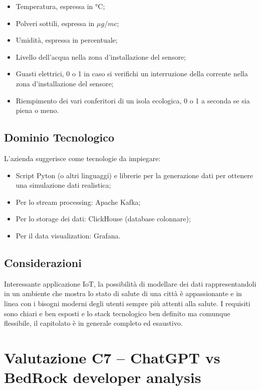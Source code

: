 \documentclass[a4paper, twoside]{article}
\begin{document}
        \begin{itemize}
            \item Temperatura, espressa in °C;
            \item Polveri sottili, espressa in $\mu g/mc$;
            \item Umidità, espressa in percentuale;
            \item Livello dell'acqua nella zona d'installazione
            del sensore;
            \item Guasti elettrici, 0 o 1 in caso si verifichi
            un interruzione della corrente nella zona d'installazione
            del sensore;
            \item Riempimento dei vari conferitori di un isola
            ecologica, 0 o 1 a seconda se sia piena o meno.
        \end{itemize}

    \subsection{Dominio Tecnologico}
        L'azienda suggerisce come tecnologie da impiegare:
        \begin{itemize}
            \item Script Pyton (o altri linguaggi) e librerie per la generazione
            dati per ottenere una simulazione dati realistica;
            \item Per lo stream processing: Apache Kafka;
            \item Per lo storage dei dati: ClickHouse (database colonnare);
            \item Per il data visualization: Grafana.
        \end{itemize}
    \subsection{Considerazioni}
    Interessante applicazione IoT, la possibilità di modellare dei dati rappresentandoli
    in un ambiente che mostra lo stato di salute di una città è appassionante e
    in linea con i bisogni moderni degli utenti sempre più attenti alla salute.
    I requisiti sono chiari e ben esposti e lo stack tecnologico ben definito ma
    comunque flessibile, il capitolato è in generale completo ed esaustivo.

    \section{Valutazione C7 -- ChatGPT vs BedRock developer analysis}
\end{document}
